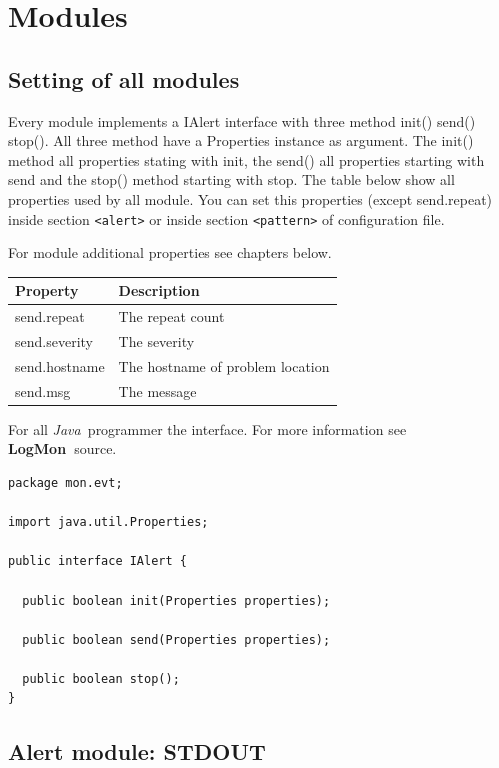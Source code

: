 \documentclass[11pt,a4paper]{article}
\newcommand{\logmon}{\textbf{LogMon\ }}
\newcommand{\java}{\textit{Java\ }}
\begin{document}
\section{Modules}
\label{sec:modules}

\subsection{Setting of all modules}

Every module implements a IAlert interface with three method init() send() stop(). All three method
have a Properties instance as argument. The init() method all properties stating with init, the send()
all properties starting with send and the stop() method starting with stop. The table below show
all properties used by all module.  You can set this properties (except send.repeat) inside section \verb#<alert># or inside
section \verb#<pattern># of configuration file.

For module additional properties see chapters below.

\begin{tabular}{l|p{}}
  Property 	& Description\\\hline
  send.repeat  	    & The repeat count \\
  send.severity 	& The severity \\
  send.hostname 	& The hostname of problem location\\
  send.msg 	        & The message\\
\end{tabular}

For all \java programmer the interface. For more information see \logmon source.

\begin{samepage}


\begin{verbatim}
package mon.evt;

import java.util.Properties;

public interface IAlert {

  public boolean init(Properties properties);

  public boolean send(Properties properties);

  public boolean stop();
}

\end{verbatim}
\end{samepage}


\subsection{Alert module: STDOUT}
\end{document}
